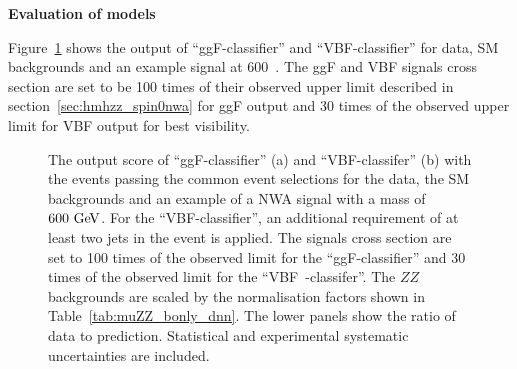 \textbf{Evaluation of models} 

Figure~\ref{fig:dnn_output_score} shows the output of ``ggF-classifier'' and ``VBF-classifier'' for data, SM backgrounds and an example signal at 600~\gev.
The ggF and VBF signals cross section are set to be 100 times of their observed upper limit described in section~\ref{sec:hmhzz_spin0nwa} for ggF output
and 30 times of the observed upper limit for VBF output for best visibility.

\begin{figure}[htbp]
        \centering
        \caption{The output score of ``ggF-classifier'' (a) and  ``VBF-classifer'' (b) with the events passing the common event selections  
        for the data, the SM backgrounds and an example of a NWA signal with a mass of $600~\text{Ge\kern -0.1em V}{}$.
        For the ``VBF-classifier'', an additional requirement of at least two jets in the event is applied.
        The signals cross section are set to 100 times of the observed limit for the ``ggF-classifier'' 
        and 30 times of the observed limit for the ``VBF~-classifer''.
        The $ZZ$ backgrounds are scaled by the normalisation factors shown in Table~\ref{tab:muZZ_bonly_dnn}.
        The lower panels show the ratio of data to prediction.
        Statistical and experimental systematic uncertainties are included.}
        \label{fig:dnn_output_score}
\end{figure}

